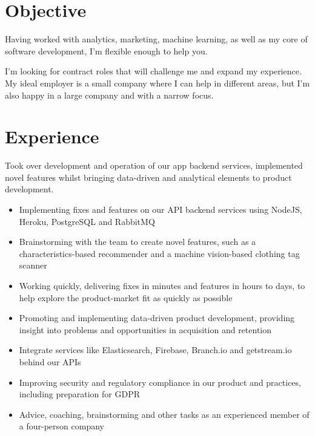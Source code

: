 \documentclass[11pt,a4paper,sans]{moderncv}        %
\begin{document}
\makecvtitle

\section{Objective}
Having worked with analytics, marketing, machine learning, as well as my core of software development, I'm flexible enough to help you.

I'm looking for contract roles that will challenge me and expand my experience.
My ideal employer is a small company where I can help in different areas, but I'm also happy in a large company and with a narrow focus.

\section{Experience}
{Took over development and operation of our app backend services, implemented novel features whilst bringing data-driven and analytical elements to product development.
\newline{}
\begin{itemize}
\item Implementing fixes and features on our API backend services using NodeJS, Heroku, PostgreSQL and RabbitMQ
\item Brainstorming with the team to create novel features, such as a characteristics-based recommender and a machine vision-based clothing tag scanner
\item Working quickly, delivering fixes in minutes and features in hours to days, to help explore the product-market fit as quickly as possible
\item Promoting and implementing data-driven product development, providing insight into problems and opportunities in acquisition and retention
\item Integrate services like Elasticsearch, Firebase, Branch.io and getstream.io behind our APIs
\item Improving security and regulatory compliance in our product and practices, including preparation for GDPR
\item Advice, coaching, brainstorming and other tasks as an experienced member of a four-person company
\end{itemize}
}
\end{document}
